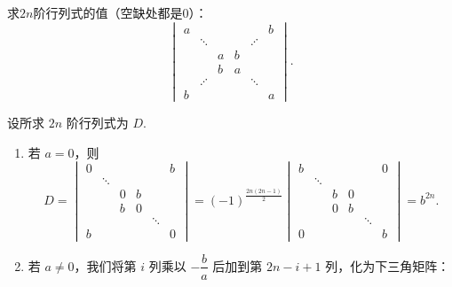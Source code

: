 \begin{exercise}
\begin{exgroup}
        \item 求$2n$阶行列式的值（空缺处都是0）：
        \[\begin{vmatrix}
                a &         &   &   &         & b \\
                  & \ddots  &   &   & \iddots &   \\
                  &         & a & b &         &   \\
                  &         & b & a &         &   \\
                  & \iddots &   &   & \ddots  &   \\
                b &         &   &   &         & a
            \end{vmatrix}.\]
        \begin{answer}
            设所求 $2n$ 阶行列式为 $D$.
            \begin{enumerate}
                \item 若 $a=0$，则
                    \[
                        D = \begin{vmatrix}
                            0 &         &   &   &         & b \\
                              & \ddots  &   &   &         &   \\
                              &         & 0 & b &         &   \\
                              &         & b & 0 &         &   \\
                              &         &   &   & \ddots  &   \\
                            b &         &   &   &         & 0
                        \end{vmatrix}
                        = (-1)^{\frac{2n(2n-1)}{2}} \begin{vmatrix}
                            b &         &   &   &         & 0 \\
                              & \ddots  &   &   &         &   \\
                              &         & b & 0 &         &   \\
                              &         & 0 & b &         &   \\
                              &         &   &   & \ddots  &   \\
                            0 &         &   &   &         & b
                        \end{vmatrix}
                        = b^{2n}.
                    \]
                \item 若 $a \neq 0$，我们将第 $i$ 列乘以 $-\dfrac{b}{a}$ 后加到第 $2n-i+1$ 列，化为下三角矩阵：

\end{enumerate}
\end{answer}
\end{exgroup}
\end{exercise}
